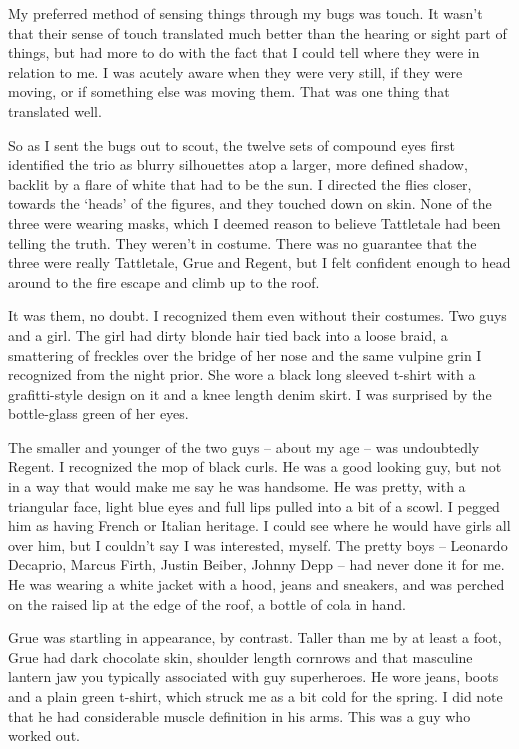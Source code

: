 My preferred method of sensing things through my bugs was touch.  It wasn't that their sense of touch translated much better than the hearing or sight part of things, but had more to do with the fact that I could tell where they were in relation to me.  I was acutely aware when they were very still, if they were moving, or if something else was moving them.  That was one thing that translated well.



So as I sent the bugs out to scout, the twelve sets of compound eyes first identified the trio as blurry silhouettes atop a larger, more defined shadow, backlit by a flare of white that had to be the sun.  I directed the flies closer, towards the `heads' of the figures, and they touched down on skin. None of the three were wearing masks, which I deemed reason to believe Tattletale had been telling the truth.   They weren't in costume.  There was no guarantee that the three were really Tattletale, Grue and Regent, but I felt confident enough to head around to the fire escape and climb up to the roof.



It was them, no doubt.  I recognized them even without their costumes.  Two guys and a girl.  The girl had dirty blonde hair tied back into a loose braid, a smattering of freckles over the bridge of her nose and the same vulpine grin I recognized from the night prior.  She wore a black long sleeved t-shirt with a grafitti-style design on it and a knee length denim skirt.  I was surprised by the bottle-glass green of her eyes.



The smaller and younger of the two guys – about my age – was undoubtedly Regent.  I recognized the mop of black curls.  He was a good looking guy, but not in a way that would make me say he was handsome.  He was pretty, with a triangular face, light blue eyes and full lips pulled into a bit of a scowl.  I pegged him as having French or Italian heritage.  I could see where he would have girls all over him, but I couldn't say I was interested, myself.  The pretty boys – Leonardo Decaprio, Marcus Firth, Justin Beiber, Johnny Depp – had never done it for me.  He was wearing a white jacket with a hood, jeans and sneakers, and was perched on the raised lip at the edge of the roof, a bottle of cola in hand.



Grue was startling in appearance, by contrast.  Taller than me by at  least a foot, Grue had dark chocolate skin, shoulder length cornrows and that masculine lantern jaw you typically associated with guy superheroes.  He wore jeans, boots and a plain green t-shirt, which struck me as a bit cold for the spring.  I did note that he had considerable muscle definition in his arms.  This was a guy who worked out.



